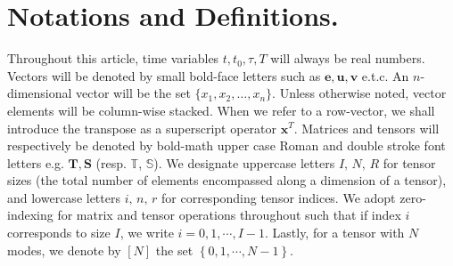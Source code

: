 \section{Notations and Definitions.}
\label{sec:notations}

\noindent Throughout this article, time variables \eg $t, t_0, \tau, T$ will always be  real numbers. Vectors will be denoted by small bold-face letters such as $\mathbf{e}, \mathbf{u}, \mathbf{v}$  e.t.c. An $n$-dimensional vector will be the set $\{x_1, x_2, \ldots, x_n\}$. Unless otherwise noted, vector elements will be column-wise stacked. When we refer to a row-vector, we shall introduce the transpose as a superscript operator \ie  $\bm{x}^T$. Matrices and tensors will respectively be denoted by bold-math upper case  Roman and double stroke font letters  e.g. $\mathbf{T}, \mathbf{S}$ (resp. $\mathbf{\mathds{T}}$, $\mathbf{\mathds{S}}$).  We designate uppercase letters $I, \, N, \, R$ for tensor sizes (the total number of elements encompassed along a dimension of a tensor), and lowercase letters $i, \, n,  \, r$ for corresponding tensor indices. We adopt zero-indexing for matrix and tensor operations throughout such that if index $i$ corresponds to size $I$, we write $i = 0, 1, \cdots , I-1$. Lastly, for a tensor with $N$ modes, we denote by $\left[N\right]$ the set $\left\{0,1,\cdots,N-1\right\}$.

%
%
%
%
